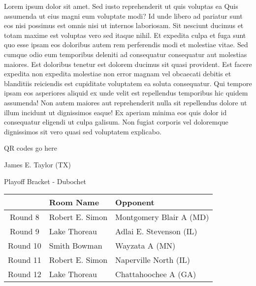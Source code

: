 \documentclass{article}%
\begin{document}
Lorem ipsum dolor sit amet. Sed iusto reprehenderit ut quis voluptas ea Quis assumenda ut eius magni eum voluptate modi? Id unde libero ad pariatur sunt eos nisi possimus est omnis nisi ut internos laboriosam. Sit nesciunt ducimus et totam maxime est voluptas vero sed itaque nihil. Et expedita culpa et fuga sunt quo esse ipsam eos doloribus autem rem perferendis modi et molestiae vitae.\newline%
\newline%
Sed cumque odio eum temporibus deleniti ad consequatur consequatur aut molestias maiores. Est doloribus tenetur est dolorem ducimus sit quasi provident. Est facere expedita non expedita molestiae non error magnam vel obcaecati debitis et blanditiis reiciendis est cupiditate voluptatem ea soluta consequatur. Qui tempore ipsam eos asperiores aliquid ex unde velit est repellendus temporibus hic quidem assumenda!\newline%
\newline%
Non autem maiores aut reprehenderit nulla sit repellendus dolore ut illum incidunt ut dignissimos eaque! Ex aperiam minima eos quis dolor id consequatur eligendi ut culpa galisum. Non fugiat corporis vel doloremque dignissimos sit vero quasi sed voluptatem explicabo.\newline%
\newline%
%
\vspace*{30pt}%
\begin{center}%
\begin{Huge}%
QR codes go here%
\end{Huge}%
\end{center}%
\newpage%
\begin{center}%
\begin{Huge}%
James E. Taylor (TX)%
\end{Huge}%
\vspace*{8pt}%
\linebreak%
\begin{Large}%
Playoff Bracket {-} Dubochet%
\end{Large}%
\end{center}%
%
\begin{tabularx}{\textwidth}{|c|Y|Y|}%
\hline%
&Room Name&Opponent\\%
\hline%
Round 8&Robert E. Simon&Montgomery Blair A (MD)\\%
Round 9&Lake Thoreau&Adlai E. Stevenson (IL)\\%
Round 10&Smith Bowman&Wayzata A (MN)\\%
Round 11&Robert E. Simon&Naperville North (IL)\\%
Round 12&Lake Thoreau&Chattahoochee A (GA)\\%
\hline%
\end{tabularx}%
\end{document}

